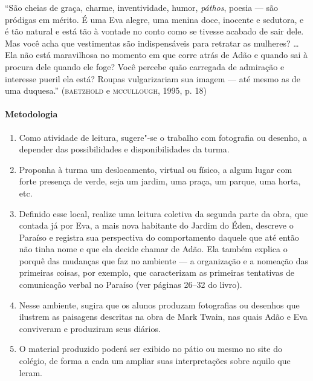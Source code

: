 \documentclass[12pt]{extarticle}
\begin{document}
``São cheias de graça, charme, inventividade, humor, \emph{páthos}, poesia
--- são pródigas em mérito. É uma Eva alegre, uma menina doce,
inocente e sedutora, e é tão natural e está tão à vontade no conto
como se tivesse acabado de sair dele. Mas você acha que vestimentas
são indispensáveis para retratar as mulheres? {}\ldots{} Ela não está
maravilhosa no momento em que corre atrás de Adão e quando
sai à procura dele quando ele foge? Você percebe quão carregada 
de admiração e interesse pueril ela está? Roupas vulgarizariam
sua imagem --- até mesmo as de uma duquesa.'' (\textsc{baetzhold} e \textsc{mccullough},
1995, p. 18)

\paragraph{Metodologia}

\begin{enumerate}
\item
Como atividade de leitura, sugere"-se o trabalho com fotografia ou
desenho, a depender das possibilidades e disponibilidades da turma. 

\item
Proponha à turma um deslocamento, virtual ou físico, a algum lugar com forte presença 
de verde, seja um jardim, uma praça, um parque, uma horta, etc. 

\item
Definido esse local, realize uma leitura coletiva da segunda parte da obra, que contada já por Eva, a mais
nova habitante do Jardim do Éden, descreve o Paraíso e registra
sua perspectiva do comportamento daquele que até
então não tinha nome e que ela decide chamar de Adão. Ela
também explica o porquê das mudanças que faz no ambiente --- a organização e a nomeação das 
primeiras coisas, por exemplo, que caracterizam as primeiras tentativas de comunicação
verbal no Paraíso (ver páginas 26--32 do livro). 



\item
Nesse ambiente, sugira que os alunos produzam fotografias ou desenhos que ilustrem as paisagens
descritas na obra de Mark Twain, nas quais Adão e Eva conviveram e
produziram seus diários. 

\item
O material produzido poderá ser exibido no
pátio ou mesmo no site do colégio, de forma a cada um ampliar suas interpretações sobre aquilo que leram.
\end{enumerate}
\end{document}
